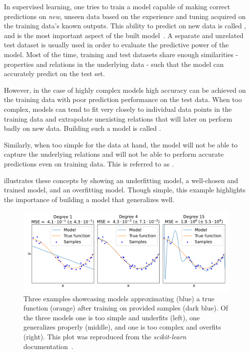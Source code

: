 In supervised learning, one tries to train a model capable of making correct predictions on \textit{new}, unseen data based on the experience and tuning acquired on the training data's known outputs.
This ability to predict on new data is called , and is the most important aspect of the built model~\cite{PR:Rosenblatt:Perceptron,BOOK:Bishop:Neural_Networks_Pattern_Recognition}.
A separate and unrelated test dataset is usually used in order to evaluate the predictive power of the model.
Most of the time, training and test datasets share enough similarities - properties and relations in the underlying data - such that the model can accurately predict on the test set.

However, in the case of highly complex models high accuracy can be achieved on the training data with poor prediction performance on the test data.
When too complex, models can tend to fit very closely to individual data points in the training data and extrapolate unexisting relations that will later on perform badly on new data.
Building such a model is called .

Similarly, when too simple for the data at hand, the model will not be able to capture the underlying relations and will not be able to perform accurate predictions even on training data.
This is referred to as .

 illustrates these concepts by showing an underfitting model, a well-chosen and trained model, and an overfitting model.
Though simple, this example highlights the importance of building a model that generalizes well.

\begin{figure}[!htb]
    \centering
    \includegraphics*[width=0.99\textwidth]{Figures/ML_for_IR_Coupling/ml_underfitting_overfitting.pdf}
    \caption{Three examples showcasing models approximating (\textcolor{mplblue}{blue}) a true function (\textcolor{mplorange}{orange}) after training on provided samples (\textcolor{mplb}{dark blue}). Of the three models one is too simple and underfits (left), one generalizes properly (middle), and one is too complex and overfits (right). This plot was reproduced from the \textit{scikit-learn} documentation~\cite{CODE:scikit-learn, Website:ScikitLearn:Overfitting_Example}.}
    \label{figure:ml_underfitting_overfitting}
\end{figure}

